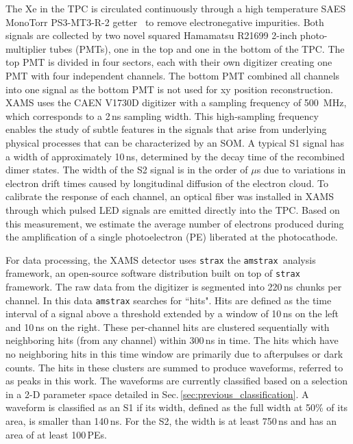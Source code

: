 The Xe in the TPC is circulated continuously through a high temperature SAES MonoTorr PS3-MT3-R-2 getter~\cite{saes2002} to remove electronegative impurities. Both  signals are collected by two novel squared Hamamatsu R21699 2-inch photo-multiplier tubes (PMTs), one in the top and one in the bottom of the TPC. The top PMT is divided in four sectors, each with their own digitizer creating one PMT with four independent channels. The bottom PMT combined all channels into one signal as the bottom PMT is not used for xy position reconstruction. XAMS uses the CAEN V1730D digitizer with a sampling frequency of 500~MHz, which corresponds to a 2\,ns sampling width. This high-sampling frequency enables the study of subtle features in the signals that arise from underlying physical processes that can be characterized by an SOM. A typical S1 signal has a width of approximately 10\,ns, determined by the decay time of the recombined dimer states. The width of the S2 signal is in the order of $\mu$s due to variations in electron drift times caused by longitudinal diffusion of the electron cloud. To calibrate the response of each channel, an optical fiber was installed in XAMS through which pulsed LED signals are emitted directly into the TPC. Based on this measurement, we estimate the average number of electrons produced during the amplification of a single photoelectron (PE) liberated at the photocathode.



For data processing, the XAMS detector uses \texttt{strax} the \texttt{amstrax}\,\cite{2023amstrax} analysis framework, an open-source software distribution built on top of \texttt{strax}~\cite{2024strax} framework. The raw data from the digitizer is segmented into 220\,ns chunks per channel. In this data \texttt{amstrax} searches for ``hits". Hits are defined as the time interval of a signal above a threshold extended by a window of 10\,ns on the left and 10\,ns on the right. These per-channel hits are clustered sequentially with neighboring hits (from any channel) within 300\,ns in time. The hits which have no neighboring hits in this time window are primarily due to afterpulses or dark counts. The hits in these clusters are summed to produce waveforms, referred to as peaks in this work.  The waveforms are currently classified based on a selection in a 2-D parameter space detailed in Sec.\,\ref{sec:previous_classification}. A waveform is classified as an S1 if its width, defined as the full width  at 50\% of its area, is smaller than 140\,ns. For the S2, the width is at least 750\,ns and has an area of at least 100\,PEs. 

